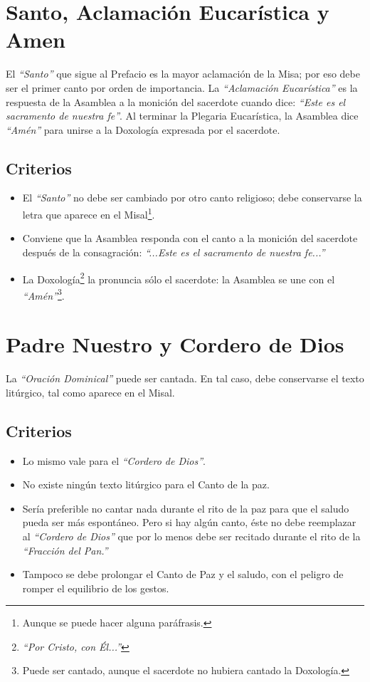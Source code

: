 \documentclass[letterpaper, 12pt]{book}
\begin{document}
    \section{Santo, Aclamaci\'on Eucar\'istica y Amen}
    El \textit{``Santo''} que sigue al Prefacio es la mayor aclamaci\'on de la Misa; por eso debe ser el primer canto por orden de importancia. La \textit{``Aclamaci\'on Eucar\'istica''} es la respuesta de la Asamblea a la monición del sacerdote cuando dice: \textit{``Este es el sacramento de nuestra fe''}. Al terminar la Plegaria Eucar\'istica, la Asamblea dice \textit{``Am\'en''} para unirse a la Doxolog\'ia expresada por el sacerdote.

    \subsection{Criterios}
    
    \begin{itemize}
        \item El \textit{``Santo''} no debe ser cambiado por otro canto religioso; debe conservarse la letra que aparece en el Misal\footnote{Aunque se puede hacer alguna par\'afrasis.}.
        \item Conviene que la Asamblea responda con el canto a la monici\'on del sacerdote despu\'es de la consagraci\'on: \textit{``...Este es el sacramento de nuestra fe...''}
        \item La Doxolog\'ia\footnote{\textit{``Por Cristo, con \'El...''}} la pronuncia s\'olo el sacerdote: la Asamblea se une con el \textit{``Am\'en''}\footnote{Puede ser cantado, aunque el sacerdote no hubiera cantado la Doxolog\'ia.}.
    \end{itemize}

    \section{Padre Nuestro y Cordero de Dios}
    La \textit{``Oraci\'on Dominical''} puede ser cantada. En tal caso, debe conservarse el texto lit\'urgico, tal como aparece en el Misal.

    \subsection{Criterios}
    
    \begin{itemize}
        \item Lo mismo vale para el \textit{``Cordero de Dios''}. 
        \item No existe ning\'un texto lit\'urgico para el Canto de la paz.
        \item Ser\'ia preferible no cantar nada durante el rito de la paz para que el saludo pueda ser m\'as espont\'aneo. Pero si hay alg\'un canto, \'este no debe reemplazar al \textit{``Cordero de Dios''} que por lo menos debe ser recitado durante el rito de la \textit{``Fracción del Pan.''}
        \item Tampoco se debe prolongar el Canto de Paz y el saludo, con el peligro de romper el equilibrio de los gestos.
    \end{itemize}
    
\end{document}
